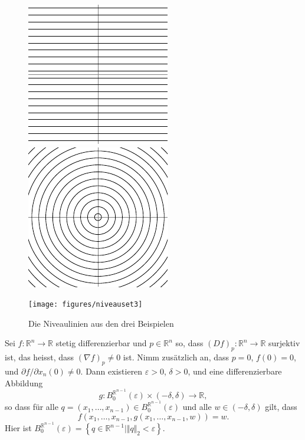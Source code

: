 \documentclass[../main.tex]{subfiles}
\begin{document}
\begin{figure}[htb] 
  \centering
  \begin{minipage}{0.33\textwidth}
    \centering
    \includegraphics{figures/niveauset1}
  \end{minipage}%
  \begin{minipage}{0.33\textwidth}
    \centering
    \includegraphics{figures/niveauset2}
  \end{minipage}%
  \begin{minipage}{0.33\textwidth}
    \centering
    \texttt{[image: figures/niveauset3]}
  \end{minipage}%
  \caption{Die Niveaulinien aus den drei Beispielen}%
  \label{fig:niveausets}
\end{figure}

\begin{theorem}%
  \label{thm:implicit-special}
  Sei $f \colon \mathbb{R}^n \to \mathbb{R}$ 
  stetig differenzierbar und $p \in \mathbb{R}^n$ 
  so, dass ${(Df)}_p \colon \mathbb{R}^n \to \mathbb{R}$ surjektiv ist,
  das heisst, dass ${(\nabla f)}_p \neq 0$ ist.
  Nimm zusätzlich an, dass $p = 0$, $f(0) = 0$,
  und $\partial f/ \partial x_n (0) \neq 0$.
  Dann existieren $\varepsilon > 0$, $\delta > 0$,
  und eine differenzierbare Abbildung
  \[
  g \colon B_0^{\mathbb{R}^{n-1}}(\varepsilon) \times (-\delta, \delta)
  \to \mathbb{R},
  \]
  so dass für alle 
  $q = (x_1, \dots, x_{n-1}) \in B_0^{\mathbb{R}^{n-1}}(\varepsilon)$ 
  und alle $w \in (-\delta, \delta)$ gilt, dass
  \[
  f(x_1, \dots, x_{n-1}, g(x_1, \dots, x_{n-1}, w)) = w.
  \]
  Hier ist $B_0^{\mathbb{R}^{n-1}}(\varepsilon)
  = \left\{q \in\mathbb{R}^{n-1} \mid \Vert q \Vert_2 < \varepsilon \right\}$.
\end{theorem}
\end{document}
